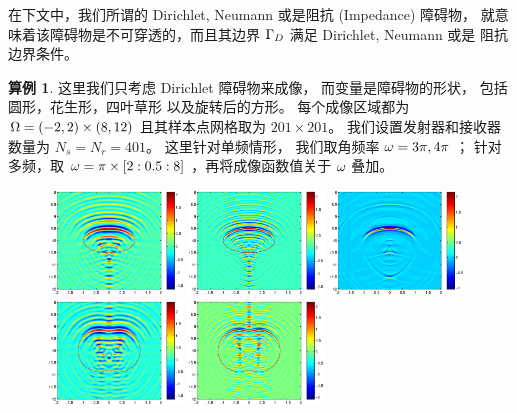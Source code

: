 {\bigskip

在下文中，我们所谓的 Dirichlet, Neumann 或是阻抗 (Impedance) 障碍物， 就意味着该障碍物是不可穿透的，而且其边界 $\Gamma_D$ 满足 Dirichlet, Neumann 或是 阻抗边界条件。


\bigskip
\textbf{算例 1}. 这里我们只考虑  Dirichlet 障碍物来成像， 而变量是障碍物的形状， 包括圆形，花生形，四叶草形 以及旋转后的方形。 每个成像区域都为 $\Omega=(-2,2) \times (8, 12)$ 且其样本点网格取为 $201 \times 201$。 我们设置发射器和接收器数量为 $N_s = N_r = 401$。 这里针对单频情形， 我们取角频率 $\omega = 3\pi,4\pi$ ； 针对多频，取 $\omega=\pi\times[2:0.5:8]$ ，再将成像函数值关于 $\omega$ 叠加。
\begin{figure}[htbp]
	\centering
	\includegraphics[width=0.32\textwidth]{./Img/graphic/circle_3pi.eps}
	\includegraphics[width=0.32\textwidth]{./Img/graphic/circle_5pi.eps}
	\includegraphics[width=0.32\textwidth]{./Img/graphic/circle.eps}
	\includegraphics[width=0.32\textwidth]{./Img/graphic/peanut_3pi.eps}
	\includegraphics[width=0.32\textwidth]{./Img/graphic/peanut_5pi.eps}

\end{figure}}
